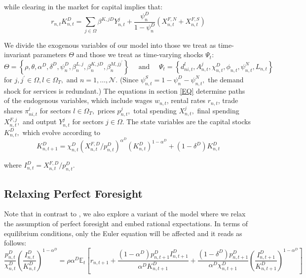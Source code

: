 \documentclass[12pt, bibtotoc, tablecaptionabove, figurecaptionabove, fleqn]{article}
\begin{document}
while clearing in the market for capital implies that:
\begin{equation*}
	r_{n, t} K_{n, t}^{D}=\sum_{j \in \Omega} \beta^{K, j D} Y_{n, t}^{j}+\frac{\psi^{D}_n}{1-\psi^{D}_n}\left(X_{n, t}^{F, N}+X_{n, t}^{F, S}\right)
\end{equation*}

We divide the exogenous variables of our model into those we treat as time-invariant parameters $\Theta$ and those we treat as time-varying shocks $\Psi_{t}:$
$$
\Theta=\left\{\rho, \theta, \alpha^D, \delta^{D}, \psi^{D}_n, \beta_{n}^{L, j}, \beta_{n}^{K, j D}, \beta_{n}^{M, j j^{\prime}}\right\} \quad \text { and } \quad \Psi_{t}=\left\{d_{n i, t}^{l}, A_{n, t}^{j}, \chi_{n, t}^{D}, \phi_{n, t}, \psi_{n, t}^{N}, L_{n, t} \right\}
$$
for $j, j^{\prime} \in \Omega, l \in \Omega_{T},$ and $n=1, \ldots, \mathcal{N} .$ (Since $\psi_{n, t}^{S}=1-\psi^{D}_n-\psi_{n, t}^{N},$ the demand
shock for services is redundant.) The equations in section \ref{EQ} determine paths of the endogenous
variables, which include wages $w_{n, t}$, rental rates $r_{n, t}$, trade shares $\pi_{n i, t}^{l}$ for sectors $l \in \Omega_{T},$ prices $p_{n, t}^{j},$ total spending $X_{n, t}^{j},$ final spending $X_{n, t}^{F, j},$ and output $Y_{n, t}^{j}$ for sectors $j \in \Omega .$ The state variables are the capital stocks $K_{n, t}^{D},$ which evolve according to
\begin{equation*}
	K_{n, t+1}^{D}=\chi_{n, t}^{D}\left(X_{n, t}^{F, D} / p_{n, t}^{D}\right)^{\alpha^D}\left(K_{n, t}^{D}\right)^{1-\alpha^D}+\left(1-\delta^{D}\right) K_{n, t}^{D}
\end{equation*}

 where $I_{n, t}^{D}=X_{n, t}^{F, D} / p_{n, t}^{D}$.



\subsection{Relaxing Perfect Foresight}
Note that in contrast to \cite{EKN2016}, we also explore a variant of the model where we relax the assumption of perfect foresight and embed rational expectations. In terms of equilibrium conditions, only the Euler equation will be affected and it reads as follows:
\begin{equation*}
	\frac{p_{n, t}^{D}}{\chi_{n, t}^{D}}\left(\frac{I_{n, t}^{D}}{K_{n, t}^{D}}\right)^{1-\alpha^D}=\rho \alpha^D \mathbb{E}_t\left[r_{n, t+1}+\frac{\left(1-\alpha^D\right) p_{n, t+1}^{D} I_{n, t+1}^{D}}{\alpha^D K_{n, t+1}^{D}}+\frac{\left(1-\delta^{D}\right) p_{n, t+1}^{D}}{\alpha^D \chi_{n, t+1}^{D}}\left(\frac{I_{n, t+1}^{D}}{K_{n, t+1}^{D}}\right)^{1-\alpha^D}\right]
\end{equation*}
\end{document}
